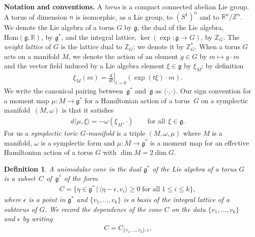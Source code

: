 \documentclass[10pt,a4paper]{amsart}
\numberwithin{equation}{section}
\newtheorem{Definition}[Lemma]{Definition}
\begin{document}
\textbf{Notation and conventions.}
A \emph{torus} is a compact connected abelian Lie group.  A torus
of dimension $n$ is isomorphic, as a Lie group, to $(S^1)^n$
and to ${\mathbb R}^n/{\mathbb Z}^n$.  We denote the Lie algebra of a torus $G$ by ${\mathfrak g}$,
the dual of the Lie algebra, $\text{Hom}({\mathfrak g},{\mathbb R})$, by ${\mathfrak g}^*$, and
the integral lattice, $\ker (\exp \colon {\mathfrak g} \to G)$, by ${\mathbb Z}_G$.
The \emph{weight lattice} of $G$ is the lattice dual to ${\mathbb Z}_G$;
we denote it by ${\mathbb Z}_G^*$.
When a torus $G$ acts on a manifold $M$, we denote the action
of an element $g \in G$ by $m \mapsto g \cdot m$ and the vector f\/ield
induced by a Lie algebra element $\xi \in {\mathfrak g}$ by $\xi_M$; by
def\/inition
\begin{gather*}
\xi_M (m) = \left. \frac{d}{dt}\right|_{t=0} (\exp
(t\xi)\cdot m).
\end{gather*}
We write the canonical pairing between~${\mathfrak g}^*$ and~${\mathfrak g}$
as $\langle \cdot, \cdot\rangle$.  Our sign convention for a moment
map $\mu \colon M \to {\mathfrak g}^*$ for a Hamiltonian action of a torus~$G$
on a symplectic manifold~$(M, \omega)$ is that it satisf\/ies
\begin{gather} \label{eq:moment_map}
d \langle \mu, \xi \rangle = - \omega (\xi_M, \cdot) \qquad \textrm{for all} \ \ \xi \in {\mathfrak g}.
\end{gather}
For us a \emph{symplectic toric $G$-manifold} is a triple $(M,\omega, \mu)$
where $M$ is a manifold, $\omega$ is a symplectic form and
$\mu\colon M\to{\mathfrak g}^*$ is a moment map for an ef\/fective Hamiltonian action of
a torus $G$ with $\dim M = 2 \dim G$.



\begin{Definition} \label{def:unimod_cone}
A \emph{unimodular cone} in the dual ${\mathfrak g}^*$ of the Lie algebra
of a torus $G$ is a subset~$C$ of~${\mathfrak g}^*$ of the form
\begin{gather*} %
C= \big\{ \eta \in {\mathfrak g}^* \,|\, \langle \eta - \epsilon , v_i \rangle \geq 0
\; \text{for all}\; 1 \leq i \leq k\big\},
\end{gather*}
where $\epsilon$ is a point in ${\mathfrak g}^*$ and $\{v_1, \ldots, v_k\}$ is a
basis of the integral lattice of a subtorus of $G$.  We record the
dependence of the cone $C$ on the data $\{v_1,\ldots,v_k\}$ and $\epsilon$ by
writing
\begin{gather*}
C = C_{\{v_1,\ldots,v_k\}, \epsilon}.
\end{gather*}
\end{Definition}
\end{document}
